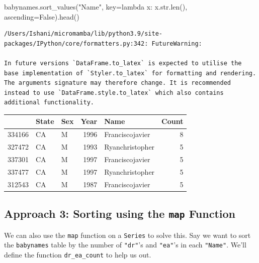 \documentclass[
  letterpaper,
  DIV=11,
  numbers=noendperiod]{scrreprt}
\newenvironment{Shaded}{\begin{snugshade}}{\end{snugshade}}
\newcommand{\BuiltInTok}[1]{\textcolor[rgb]{0.00,0.23,0.31}{#1}}
\newcommand{\KeywordTok}[1]{\textcolor[rgb]{0.00,0.23,0.31}{#1}}
\newcommand{\NormalTok}[1]{\textcolor[rgb]{0.00,0.23,0.31}{#1}}
\newcommand{\OperatorTok}[1]{\textcolor[rgb]{0.37,0.37,0.37}{#1}}
\newcommand{\StringTok}[1]{\textcolor[rgb]{0.13,0.47,0.30}{#1}}
\newcommand{\VariableTok}[1]{\textcolor[rgb]{0.07,0.07,0.07}{#1}}
\begin{document}
\begin{Shaded}
\begin{Highlighting}[]
\NormalTok{babynames.sort\_values(}\StringTok{"Name"}\NormalTok{, key}\OperatorTok{=}\KeywordTok{lambda}\NormalTok{ x: x.}\BuiltInTok{str}\NormalTok{.}\BuiltInTok{len}\NormalTok{(), ascending}\OperatorTok{=}\VariableTok{False}\NormalTok{).head()}
\end{Highlighting}
\end{Shaded}

\begin{verbatim}
/Users/Ishani/micromamba/lib/python3.9/site-packages/IPython/core/formatters.py:342: FutureWarning:

In future versions `DataFrame.to_latex` is expected to utilise the base implementation of `Styler.to_latex` for formatting and rendering. The arguments signature may therefore change. It is recommended instead to use `DataFrame.style.to_latex` which also contains additional functionality.
\end{verbatim}

\begin{tabular}{lllrlr}
\toprule
{} & State & Sex &  Year &             Name &  Count \\
\midrule
334166 &    CA &   M &  1996 &  Franciscojavier &      8 \\
327472 &    CA &   M &  1993 &  Ryanchristopher &      5 \\
337301 &    CA &   M &  1997 &  Franciscojavier &      5 \\
337477 &    CA &   M &  1997 &  Ryanchristopher &      5 \\
312543 &    CA &   M &  1987 &  Franciscojavier &      5 \\
\bottomrule
\end{tabular}

\hypertarget{approach-3-sorting-using-the-map-function}{%
\subsection{\texorpdfstring{Approach 3: Sorting using the \texttt{map}
Function}{Approach 3: Sorting using the map Function}}\label{approach-3-sorting-using-the-map-function}}

We can also use the \texttt{map} function on a \texttt{Series} to solve
this. Say we want to sort the \texttt{babynames} table by the number of
\texttt{"dr"}'s and \texttt{"ea"}'s in each \texttt{"Name"}. We'll
define the function \texttt{dr\_ea\_count} to help us out.
\end{document}
